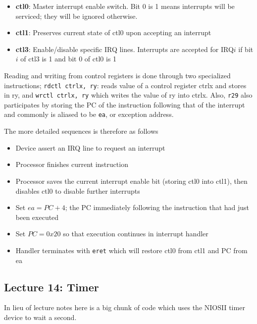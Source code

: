 \documentclass[../notes.tex]{subfiles}
\begin{document}
\begin{definition}

	\begin{itemize}
		\item \textbf{ctl0}: Master interrupt enable switch. Bit 0 is 1 means interrupts will be serviced; they will be ignored otherwise.  
		\item \textbf{ctl1}: Preserves current state of ctl0 upon accepting an interrupt
		\item \textbf{ctl3}: Enable/disable specific IRQ lines. Interrupts are accepted for IRQ$i$ if bit $ i $ of ctl3 is 1 and bit 0 of ctl0 is 1
	\end{itemize}

	Reading and writing from control registers is done through two specialized instructions; \texttt{rdctl ctrlx, ry}: reads value of a control register ctrlx and stores in ry, and \texttt{wrctl ctrlx, ry} which writes the value of ry into ctrlx.
	Also, \texttt{r29} also participates by storing the PC of the instruction following that of the interrupt and commonly is aliased to be \texttt{ea}, or exception address.

\end{definition}

The more detailed sequences is therefore as follows

\begin{itemize}
	\item Device assert an IRQ line to request an interrupt
	\item Processor finishes current instruction
	\item Processor saves the current interrupt enable bit (storing ctl0 into ctl1), then disables ctl0 to disable further interrupts
	\item Set $ ea = PC + 4 $; the PC immediately following the instruction that had just been executed
	\item Set $ PC = 0x20 $ so that execution continues in interrupt handler
	\item Handler terminates with \texttt{eret} which will restore ctl0 from ctl1 and PC from ea
\end{itemize}


\subsection{Lecture 14: Timer}


In lieu of lecture notes here is a big chunk of code which uses the NIOSII timer device to wait a second.
\end{document}
